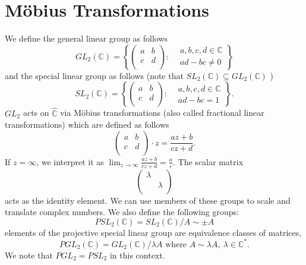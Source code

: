 \documentclass{article}
\begin{document}
\section{Möbius Transformations}

We define the general linear group as follows
\[
    GL_2(\mathbb{C} ) = \left\{ \begin{pmatrix}
        a &  b \\
        c &  d \\
    \end{pmatrix}: \begin{aligned} &a,b,c,d \in \mathbb{C} \\ &ad - bc\neq 0 \end{aligned} \right\} 
\]
and the special linear group as follows (note that \( SL_2(\mathbb{C} ) \subseteq GL_2(\mathbb{C} ) \) )
\[
    SL_2(\mathbb{C} ) = \left\{ \begin{pmatrix}
        a &  b \\
        c &  d \\
    \end{pmatrix}: \begin{aligned} &a,b,c,d \in \mathbb{C} \\ &ad - bc = 1 \end{aligned} \right\}.
\]
\( GL_2 \) acts on \( \hat{\mathbb{C} }  \) via Möbius transformations (also called fractional linear transformations) which are defined as follows
\[
    \begin{pmatrix}
        a &  b \\
        c &  d \\
    \end{pmatrix}\cdot z = \frac{az + b}{cz + d}. 
\]
If \( z = \infty  \), we interpret it as \( \lim_{z \to \infty} \frac{az + b}{cz + d} = \frac{a}{c}   \). The scalar matrix
\[
    \begin{pmatrix}
        \lambda    &   \\
         &   \lambda \\
    \end{pmatrix}
\]
acts as the identity element. We can use members of these groups to scale and translate complex numbers. We also define the following groups:
\[
    PSL_2(\mathbb{C} ) = SL_2(\mathbb{C} )/A \sim \pm A
\]
elements of the projective special linear group are equivalence classes of matrices, 
\[
    PGL_2(\mathbb{C} ) = GL_2(\mathbb{C} )/\lambda A \text{ where } A \sim \lambda A, \ \lambda \in \mathbb{C} ^\ast.
\]
We note that \( PGL_2 = PSL_2 \) in this context. 
\end{document}
